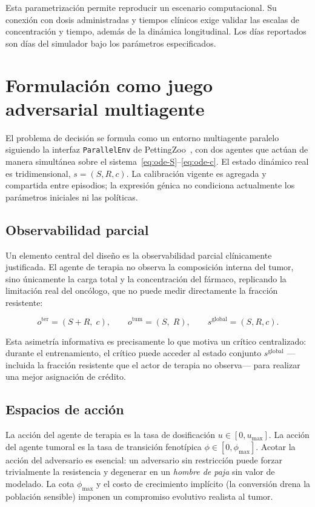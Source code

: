 Esta parametrización permite reproducir un escenario computacional. Su conexión con dosis administradas y tiempos clínicos exige validar las escalas de concentración y tiempo, además de la dinámica longitudinal. Los días reportados son días del simulador bajo los parámetros especificados.

\section{Formulación como juego adversarial multiagente}
\label{sec:juego}

El problema de decisión se formula como un entorno multiagente paralelo siguiendo la interfaz \texttt{ParallelEnv} de PettingZoo~\cite{Terry2021}, con dos agentes que actúan de manera simultánea sobre el sistema~\eqref{eq:ode-S}--\eqref{eq:ode-c}. El estado dinámico real es tridimensional, $s=(S,R,c)$. La calibración vigente es agregada y compartida entre episodios; la expresión génica no condiciona actualmente los parámetros iniciales ni las políticas.

\subsection{Observabilidad parcial}

Un elemento central del diseño es la observabilidad parcial clínicamente justificada. El agente de terapia no observa la composición interna del tumor, sino únicamente la carga total y la concentración del fármaco, replicando la limitación real del oncólogo, que no puede medir directamente la fracción resistente:

\begin{equation}
  o^{\text{ter}} = (S+R,\; c), \qquad o^{\text{tum}} = (S,\; R), \qquad s^{\text{global}} = (S, R, c). \label{eq:obs}
\end{equation}

Esta asimetría informativa es precisamente lo que motiva un crítico centralizado: durante el entrenamiento, el crítico puede acceder al estado conjunto $s^{\text{global}}$ ---incluida la fracción resistente que el actor de terapia no observa--- para realizar una mejor asignación de crédito.

\subsection{Espacios de acción}

La acción del agente de terapia es la tasa de dosificación $u \in [0, u_{\max}]$. La acción del agente tumoral es la tasa de transición fenotípica $\phi \in [0, \phi_{\max}]$. Acotar la acción del adversario es esencial: un adversario sin restricción puede forzar trivialmente la resistencia y degenerar en un \emph{hombre de paja} sin valor de modelado. La cota $\phi_{\max}$ y el costo de crecimiento implícito (la conversión drena la población sensible) imponen un compromiso evolutivo realista al tumor.

